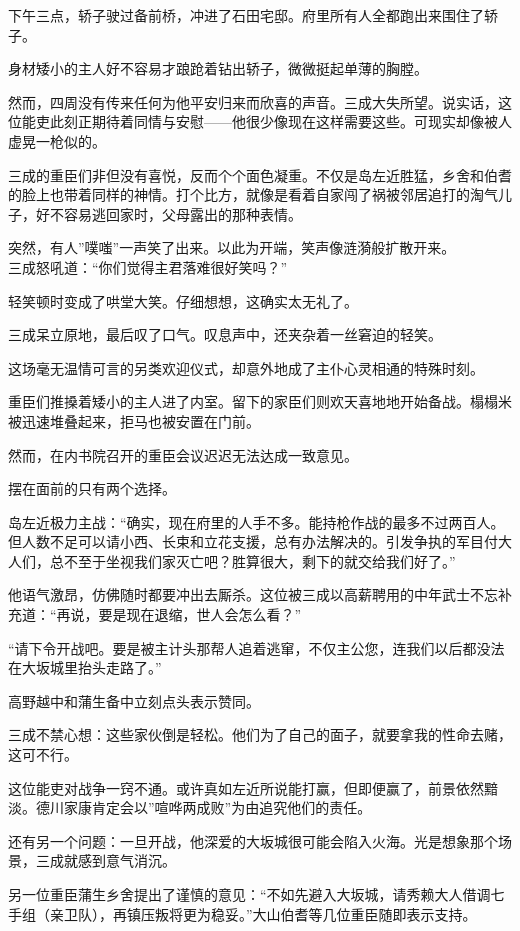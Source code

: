 \documentclass[
]{book}
\begin{document}
下午三点，轿子驶过备前桥，冲进了石田宅邸。府里所有人全都跑出来围住了轿子。

身材矮小的主人好不容易才踉跄着钻出轿子，微微挺起单薄的胸膛。

然而，四周没有传来任何为他平安归来而欣喜的声音。三成大失所望。说实话，这位能吏此刻正期待着同情与安慰------他很少像现在这样需要这些。可现实却像被人虚晃一枪似的。

三成的重臣们非但没有喜悦，反而个个面色凝重。不仅是岛左近胜猛，乡舍和伯耆的脸上也带着同样的神情。打个比方，就像是看着自家闯了祸被邻居追打的淘气儿子，好不容易逃回家时，父母露出的那种表情。

突然，有人''噗嗤''一声笑了出来。以此为开端，笑声像涟漪般扩散开来。\\
三成怒吼道：``你们觉得主君落难很好笑吗？''

轻笑顿时变成了哄堂大笑。仔细想想，这确实太无礼了。

三成呆立原地，最后叹了口气。叹息声中，还夹杂着一丝窘迫的轻笑。

这场毫无温情可言的另类欢迎仪式，却意外地成了主仆心灵相通的特殊时刻。

重臣们推搡着矮小的主人进了内室。留下的家臣们则欢天喜地地开始备战。榻榻米被迅速堆叠起来，拒马也被安置在门前。

然而，在内书院召开的重臣会议迟迟无法达成一致意见。

摆在面前的只有两个选择。

岛左近极力主战：``确实，现在府里的人手不多。能持枪作战的最多不过两百人。但人数不足可以请小西、长束和立花支援，总有办法解决的。引发争执的军目付大人们，总不至于坐视我们家灭亡吧？胜算很大，剩下的就交给我们好了。''

他语气激昂，仿佛随时都要冲出去厮杀。这位被三成以高薪聘用的中年武士不忘补充道：``再说，要是现在退缩，世人会怎么看？''

``请下令开战吧。要是被主计头那帮人追着逃窜，不仅主公您，连我们以后都没法在大坂城里抬头走路了。''

高野越中和蒲生备中立刻点头表示赞同。

三成不禁心想：这些家伙倒是轻松。他们为了自己的面子，就要拿我的性命去赌，这可不行。

这位能吏对战争一窍不通。或许真如左近所说能打赢，但即便赢了，前景依然黯淡。德川家康肯定会以''喧哗两成败''为由追究他们的责任。

还有另一个问题：一旦开战，他深爱的大坂城很可能会陷入火海。光是想象那个场景，三成就感到意气消沉。

另一位重臣蒲生乡舍提出了谨慎的意见：``不如先避入大坂城，请秀赖大人借调七手组（亲卫队），再镇压叛将更为稳妥。''大山伯耆等几位重臣随即表示支持。
\end{document}
